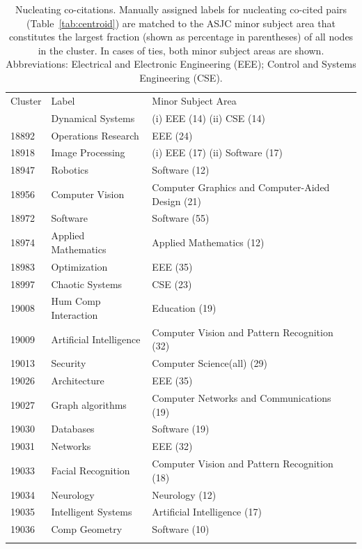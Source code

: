 \begin{table}[ht]
\caption{Nucleating co-citations. Manually assigned labels for nucleating co-cited pairs (Table~\ref{tab:centroid}) are matched to the ASJC minor subject area that constitutes the largest fraction (shown as percentage in parentheses) of all nodes in the cluster. In cases of ties, both minor subject areas are shown. Abbreviations: Electrical and Electronic Engineering (EEE); Control and Systems Engineering (CSE).}
\label{tab:centroid_reconcile}       
\begin{tabular}{p{8 mm}p{42 mm}l}
\hline\noalign{\smallskip}
Cluster & Label & Minor Subject Area \\
\noalign{\smallskip}\hline
18670 & Dynamical Systems & (i) EEE (14) (ii) CSE (14) \\
18892 & Operations Research & EEE (24) \\ 
18918 & Image Processing & (i) EEE (17) (ii) Software (17) \\ 
18947 & Robotics & Software (12) \\ 
18956 & Computer Vision & Computer Graphics and Computer-Aided Design (21)\\ 
18972 & Software & Software (55) \\ 
18974 & Applied Mathematics & Applied Mathematics (12)\\ 
18983 & Optimization & EEE (35) \\ 
18997 & Chaotic Systems & CSE (23)\\ 
19008 & Hum Comp Interaction & Education (19)\\ 
19009 & Artificial Intelligence & Computer Vision and Pattern Recognition (32)\\ 
19013 & Security & Computer Science(all) (29)\\ 
19026 & Architecture & EEE (35) \\ 
19027 & Graph algorithms & Computer Networks and Communications (19)\\ 
19030 & Databases & Software (19)\\ 
19031 & Networks & EEE (32)\\ 
19033 & Facial Recognition & Computer Vision and Pattern Recognition (18)\\ 
19034 & Neurology & Neurology (12)\\ 
19035 & Intelligent Systems & Artificial Intelligence (17)\\ 
19036 & Comp Geometry & Software (10)\\ 
\noalign{\smallskip}\hline
\end{tabular}
\end{table}
\newpage

